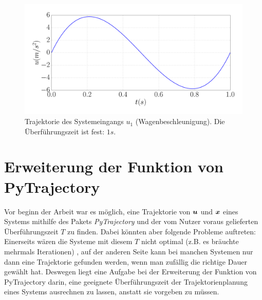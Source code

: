 \begin{beispiel}
	
	
	\begin{figure}[!h]
		\centering
		\includegraphics[width=0.7\linewidth]{bild/30_32/test0_ohne_k_ori_u.pdf}%
		\caption[Trajektorie des Systemeingangs $u_{1}$ (Wagenbeschleunigung).]{Trajektorie des Systemeingangs $u_{1}$ (Wagenbeschleunigung). Die Überführungszeit ist fest: $1s$.}
		\label{fig:Doppelintegrator_ohne_k_u}
	\end{figure}
\end{beispiel}

\section{Erweiterung der Funktion von PyTrajectory}
\label{Erweiterung_der_Funktion_von_PyTrajectory}
Vor beginn der Arbeit war es möglich, eine Trajektorie von $\boldsymbol u$ und $\boldsymbol x$ eines Systems mithilfe des Pakets \emph{PyTrajectory} und der vom Nutzer voraus gelieferten Überführungszeit $T$ zu finden. Dabei könnten aber folgende Probleme auftreten: Einerseits wären die Systeme mit diesem $T$ nicht optimal (z.B. es bräuchte mehrmals Iterationen) , auf der anderen Seite kann bei manchen Systemen nur dann eine Trajektorie gefunden werden, wenn man zufällig die richtige Dauer gewählt hat. Deswegen liegt eine Aufgabe bei der Erweiterung der Funktion von PyTrajectory darin, eine geeignete Überführungszeit der Trajektorienplanung eines Systems ausrechnen zu lassen, anstatt sie vorgeben zu müssen.

